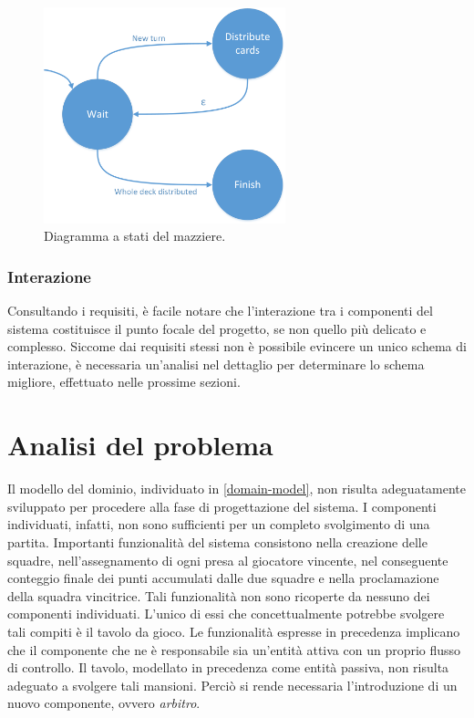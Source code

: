 \documentclass[a4paper,12pt]{article}
\begin{document}
\begin{figure}[H]
	\hspace*{-0.7in}
	\centering
	\includegraphics[width=70mm]{./img/dealer_state_diagram.png}
	\caption{Diagramma a stati del mazziere.  \label{dealer-state-diagram}}
\end{figure}

\subsubsection{Interazione}

Consultando i requisiti, è facile notare che l'interazione tra i componenti del sistema costituisce il punto focale del progetto, se non quello più delicato e complesso. Siccome dai requisiti stessi non è possibile evincere un unico schema di interazione, è necessaria un'analisi nel dettaglio per determinare lo schema migliore, effettuato nelle prossime sezioni.  

\section{Analisi del problema} \label{problem-analysis}
Il modello del dominio, individuato in \autoref{domain-model}, non risulta adeguatamente sviluppato per procedere alla fase di progettazione del sistema. I componenti individuati, infatti, non sono sufficienti per un completo svolgimento di una partita. Importanti funzionalità del sistema consistono nella creazione delle squadre, nell'assegnamento di ogni presa al giocatore vincente, nel conseguente conteggio finale dei punti accumulati dalle due squadre e nella proclamazione della squadra vincitrice. Tali funzionalità non sono ricoperte da nessuno dei componenti individuati. L'unico di essi che concettualmente potrebbe svolgere tali compiti è il tavolo da gioco. Le funzionalità espresse in precedenza implicano che il componente che ne è responsabile sia un'entità attiva con un proprio flusso di controllo. Il tavolo, modellato in precedenza come entità passiva, non risulta adeguato a svolgere tali mansioni. Perciò si rende necessaria l'introduzione di un nuovo componente, ovvero \emph{arbitro}.
\end{document}
